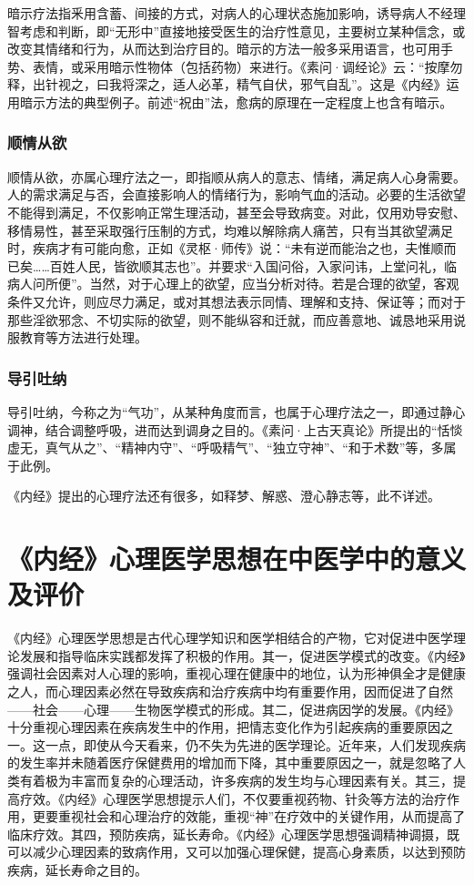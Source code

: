 \documentclass[12pt]{ctexbook}
\begin{document}
暗示疗法指釆用含蓄、间接的方式，对病人的心理状态施加影响，诱导病人不经理智考虑和判断，即“无形中”直接地接受医生的治疗性意见，主要树立某种信念，或改变其情绪和行为，从而达到治疗目的。暗示的方法一般多采用语言，也可用手势、表情，或采用暗示性物体（包括药物）来进行。《素问·调经论》云：“按摩勿释，出针视之，曰我将深之，适人必革，精气自伏，邪气自乱”。这是《内经》运用暗示方法的典型例子。前述“祝由”法，愈病的原理在一定程度上也含有暗示。

\subsubsection{顺情从欲}%

顺情从欲，亦属心理疗法之一，即指顺从病人的意志、情绪，满足病人心身需要。人的需求满足与否，会直接影响人的情绪行为，影响气血的活动。必要的生活欲望不能得到满足，不仅影响正常生理活动，甚至会导致病变。对此，仅用劝导安慰、移情易性，甚至采取强行压制的方式，均难以解除病人痛苦，只有当其欲望满足时，疾病才有可能向愈，正如《灵枢·师传》说：“未有逆而能治之也，夫惟顺而已矣……百姓人民，皆欲顺其志也”。并要求“入国问俗，入家问讳，上堂问礼，临病人问所便”。当然，对于心理上的欲望，应当分析对待。若是合理的欲望，客观条件又允许，则应尽力满足，或对其想法表示同情、理解和支持、保证等；而对于那些淫欲邪念、不切实际的欲望，则不能纵容和迁就，而应善意地、诚恳地采用说服教育等方法进行处理。

\subsubsection{导引吐纳}%

导引吐纳，今称之为“气功”，从某种角度而言，也属于心理疗法之一，即通过静心调神，结合调整呼吸，进而达到调身之目的。《素问·上古天真论》所提出的“恬惔虚无，真气从之”、“精神内守”、“呼吸精气”、“独立守神”、“和于术数”等，多属于此例。

《内经》提出的心理疗法还有很多，如释梦、解惑、澄心静志等，此不详述。

\section{《内经》心理医学思想在中医学中的意义及评价}%

《内经》心理医学思想是古代心理学知识和医学相结合的产物，它对促进中医学理论发展和指导临床实践都发挥了积极的作用。其一，促进医学模式的改变。《内经》强调社会因素对人心理的影响，重视心理在健康中的地位，认为形神俱全才是健康之人，而心理因素必然在导致疾病和治疗疾病中均有重要作用，因而促进了自然——社会——心理——生物医学模式的形成。其二，促进病因学的发展。《内经》十分重视心理因素在疾病发生中的作用，把情志变化作为引起疾病的重要原因之一。这一点，即使从今天看来，仍不失为先进的医学理论。近年来，人们发现疾病的发生率并未随着医疗保健费用的增加而下降，其中重要原因之一，就是忽略了人类有着极为丰富而复杂的心理活动，许多疾病的发生均与心理因素有关。其三，提高疗效。《内经》心理医学思想提示人们，不仅要重视药物、针灸等方法的治疗作用，更要重视社会和心理治疗的效能，重视“神”在疗效中的关键作用，从而提高了临床疗效。其四，预防疾病，延长寿命。《内经》心理医学思想强调精神调摄，既可以减少心理因素的致病作用，又可以加强心理保健，提高心身素质，以达到预防疾病，延长寿命之目的。

\ifx \allfiles \undefined
\end{document}
